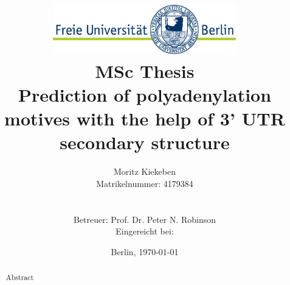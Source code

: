 \documentclass[11pt,a4paper,english]{article}
\title{\includegraphics[width=0.6\textwidth]{pictures/logo}\\
{\normalsize MSc Thesis}\\[6ex]
Prediction of polyadenylation motives with the help of 3' UTR secondary structure}
\author{Moritz Kiekeben\\
{\normalsize Matrikelnummer: 4179384}\\
{\normalsize \mailto{moritz.k@fu-berlin.de}}\\\\
{\normalsize Betreuer: Prof. Dr. Peter N. Robinson}\\
{\normalsize Eingereicht bei: }}
\date{Berlin, \today}
\begin{document}
\begin{titlepage}

\maketitle
\thispagestyle{empty}

\vfill{}

\begin{abstract}
Abstract
\end{abstract}

\vfill{}

\end{titlepage}

\pagestyle{empty}
\clearpage{}



\tableofcontents

\clearpage{}
\pagestyle{fancy}
\setcounter{page}{1}
      
      
            

      



\end{document}
